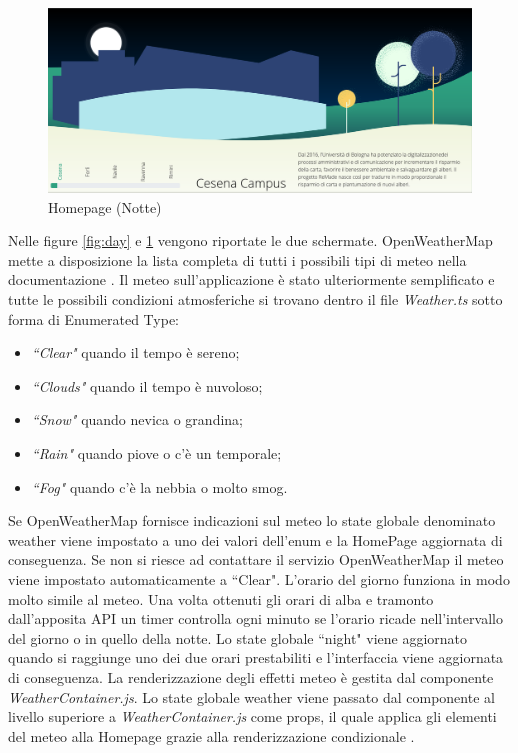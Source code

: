 \begin{figure}[H]
    \centering
    \includegraphics[width=\linewidth]{img/night.png}
        \caption{Homepage (Notte)}
    \label{fig:night}
\end{figure}

\noindent Nelle figure \ref{fig:day} e \ref{fig:night} vengono riportate le due schermate.
OpenWeatherMap mette a disposizione la lista completa di tutti i possibili tipi di meteo nella documentazione \cite{openweatherWeather}.
Il meteo sull'applicazione è stato ulteriormente semplificato e tutte le possibili condizioni atmosferiche si trovano dentro il file \textit{Weather.ts} sotto forma di Enumerated Type:
\begin{itemize}
    \item \textit{``Clear"} quando il tempo è sereno;
    \item \textit{``Clouds"} quando il tempo è nuvoloso;
    \item \textit{``Snow"} quando nevica o grandina;
    \item \textit{``Rain"} quando piove o c'è un temporale;
    \item \textit{``Fog"} quando c'è la nebbia o molto smog.
\end{itemize}
Se OpenWeatherMap fornisce indicazioni sul meteo lo state globale denominato weather viene impostato a uno dei valori dell'enum e la HomePage aggiornata di conseguenza.\newline
Se non si riesce ad contattare il servizio OpenWeatherMap il meteo viene impostato automaticamente a ``Clear".\newline
L'orario del giorno funziona in modo molto simile al meteo. Una volta ottenuti gli orari di alba e tramonto dall'apposita API un timer controlla ogni minuto se l'orario ricade nell'intervallo del giorno o in quello della notte. Lo state globale ``night" viene aggiornato quando si raggiunge uno dei due orari prestabiliti e l'interfaccia viene aggiornata di conseguenza.\newline\newline
La renderizzazione degli effetti meteo è gestita dal componente \textit{WeatherContainer.js}. Lo state globale weather viene passato dal componente al livello superiore a \textit{WeatherContainer.js} come props, il quale applica gli elementi del meteo alla Homepage grazie alla renderizzazione condizionale \cite{reactCond}.


